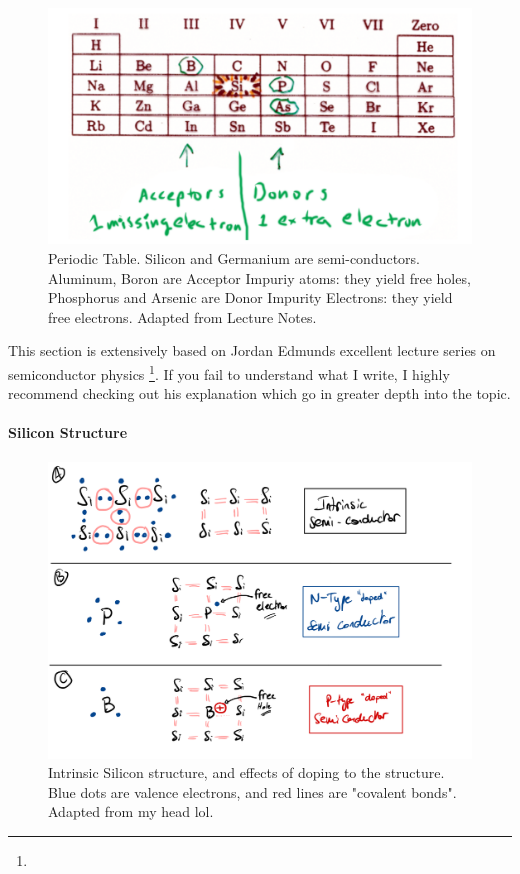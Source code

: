 \begin{figure}[H]
    \centering
    \includegraphics[width=0.95\linewidth]{../../Figures/Periodic_Table_Silicon.PNG}
    \caption{Periodic Table. Silicon and Germanium are semi-conductors. Aluminum, Boron are Acceptor Impuriy atoms: they yield free holes, Phosphorus and Arsenic are Donor Impurity Electrons: they yield free electrons. Adapted from Lecture Notes.}
    \label{fig:Periodic_Table_Conduction}
\end{figure}

This section is extensively based on Jordan Edmunds excellent lecture series on semiconductor physics \footnote{}. If you fail to understand what I write, I highly recommend checking out his explanation which go in greater depth into the topic. 

\paragraph{Silicon Structure}

\begin{figure}[H]
    \centering
    \includegraphics[width=0.85\linewidth]{../../Figures/Silicon doping.PNG}
    \caption{Intrinsic Silicon structure, and effects of doping to the structure. Blue dots are valence electrons, and red lines are "covalent bonds". Adapted from my head lol.}
    \label{fig:Silicon_Doping}
\end{figure}

